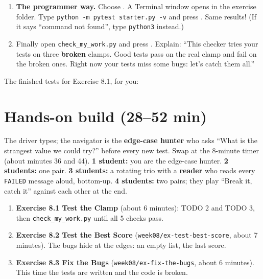\begin{workedexample}
\begin{enumerate}[leftmargin=1.4em]
  \item \textbf{The programmer way.} Choose . A Terminal window opens in the exercise folder. Type
        \texttt{python -m pytest starter.py -v} and press . Same results! (If it says \enquote{command not found}, type \texttt{python3} instead.)
  \item Finally open \texttt{check\_my\_work.py} and press . Explain: \enquote{This checker tries your tests on three \textbf{broken} clamps.
        Good tests pass on the real clamp and fail on the broken ones. Right now your tests miss some bugs: let's catch them all.}
\end{enumerate}
\end{workedexample}
The finished tests for Exercise 8.1, for you:

\section{Hands-on build (28--52 min)}
\begin{pairroles}
The driver types; the navigator is the \textbf{edge-case hunter} who asks \enquote{What is the strangest value we could try?} before every new test.
Swap at the 8-minute timer (about minutes 36 and 44).
\textbf{1 student:} you are the edge-case hunter. \textbf{2 students:} one pair. \textbf{3 students:} a rotating trio with a \textbf{reader}
who reads every \texttt{FAILED} message aloud, bottom-up. \textbf{4 students:} two pairs; they play \enquote{Break it, catch it} against each other at the end.
\end{pairroles}
\begin{enumerate}[leftmargin=1.4em]
  \item \textbf{Exercise 8.1 Test the Clamp} (about 6 minutes): TODO 2 and TODO 3, then \texttt{check\_my\_work.py} until all 5 checks pass.
  \item \textbf{Exercise 8.2 Test the Best Score} (\texttt{week08/ex-test-best-score}, about 7 minutes). The bugs hide at the edges: an empty list, the last score.
  \item \textbf{Exercise 8.3 Fix the Bugs} (\texttt{week08/ex-fix-the-bugs}, about 6 minutes). This time the tests are written and the code is broken.
\end{enumerate}

